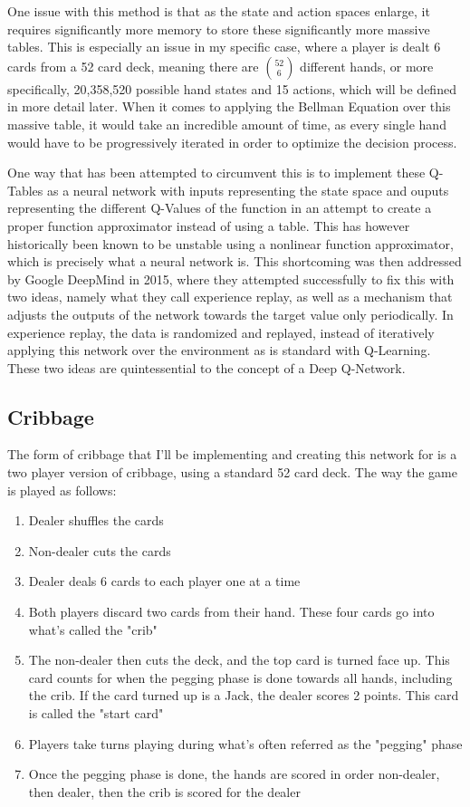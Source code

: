 \documentclass[]{article}
\begin{document}
One issue with this method is that as the state and action spaces enlarge, it requires significantly more memory to store these significantly more massive tables. This is especially an issue in my specific case, where a player is dealt 6 cards from a 52 card deck, meaning there are $52\choose{6}$ different hands, or more specifically, 20,358,520 possible hand states and 15 actions, which will be defined in more detail later. When it comes to applying the Bellman Equation over this massive table, it would take an incredible amount of time, as every single hand would have to be progressively iterated in order to optimize the decision process.

One way that has been attempted to circumvent this is to implement these Q-Tables as a neural network with inputs representing the state space and ouputs representing the different Q-Values of the function in an attempt to create a proper function approximator instead of using a table. This has however historically been known to be unstable using a nonlinear function approximator, which is precisely what a neural network is\cite{temp_diff_analysis}. This shortcoming was then addressed by Google DeepMind in 2015, where they attempted successfully to fix this with two ideas, namely what they call experience replay, as well as a mechanism that adjusts the outputs of the network towards the target value only periodically\cite{deepmind_2015}. In experience replay, the data is randomized and replayed, instead of iteratively applying this network over the environment as is standard with Q-Learning. These two ideas are quintessential to the concept of a Deep Q-Network.

\subsection{Cribbage}

The form of cribbage that I'll be implementing and creating this network for is a two player version of cribbage, using a standard 52 card deck. The way the game is played as follows:

\begin{enumerate}
    \item Dealer shuffles the cards 
    \item Non-dealer cuts the cards 
    \item Dealer deals 6 cards to each player one at a time 
    \item Both players discard two cards from their hand. These four cards go into what's called the "crib"
    \item The non-dealer then cuts the deck, and the top card is turned face up. This card counts for when the pegging phase is done towards all hands, including the crib. If the card turned up is a Jack, the dealer scores 2 points. This card is called the "start card"
    \item Players take turns playing during what's often referred as the "pegging" phase 
    \item Once the pegging phase is done, the hands are scored in order non-dealer, then dealer, then the crib is scored for the dealer
\end{enumerate}
\end{document}
